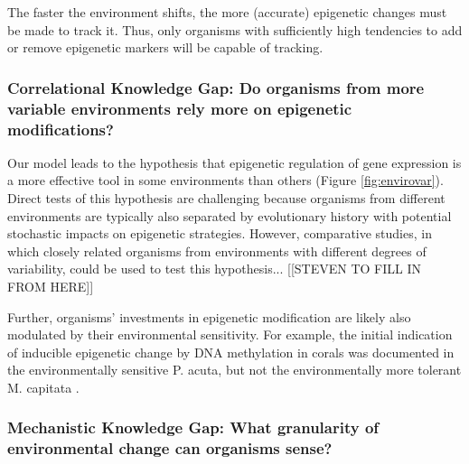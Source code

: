 \documentclass{article}
\begin{document}
The faster the environment shifts, the more (accurate) epigenetic changes must be made to track it. Thus, only organisms with sufficiently high tendencies to add or remove epigenetic markers will be capable of tracking.


\subsubsection{Correlational Knowledge Gap: Do organisms from more variable environments rely more on epigenetic modifications?}

Our model leads to the hypothesis that epigenetic regulation of gene expression is a more effective tool in some environments than others (Figure \ref{fig:envirovar}). Direct tests of this hypothesis are challenging because organisms from different environments are typically also separated by evolutionary history with potential stochastic impacts on epigenetic strategies. However, comparative studies, in which closely related organisms from environments with different degrees of variability, could be used to test this hypothesis... [[STEVEN TO FILL IN FROM HERE]]

Further, organisms' investments in epigenetic modification are likely also modulated by their environmental sensitivity. For example, the initial indication of inducible epigenetic change by DNA methylation in corals was documented in the environmentally sensitive P. acuta, but not the environmentally more tolerant M. capitata \cite{putnam2016ocean}.


\subsubsection{Mechanistic Knowledge Gap: What granularity of environmental change can organisms sense?}
\end{document}
